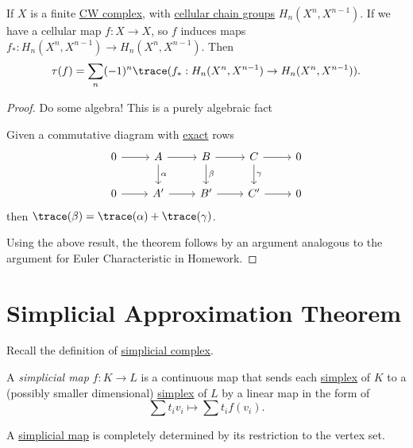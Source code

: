 \begin{theorem}\label{thm-}
	If \(X\) is a finite \hyperref[def:CW-Complex]{CW complex}, with \hyperref[def:cellular-chain-group]{cellular chain groups} \(H_n(X^n, X^{n - 1})\).
	If we have a cellular map \(f \colon X \to X\), so \(f\) induces maps \(f_\ast \colon H_n(X^n, X^{n - 1}) \to H_n(X^n, X^{n - 1})\). Then
	\[
		\tau(f) = \sum_n (-1)^n \trace(f_\ast : H_n(X^n, X^{n - 1}) \to H_n(X^n, X^{n - 1})).
	\]
\end{theorem}
\begin{proof}
	Do some algebra! This is a purely algebraic fact
	\begin{exercise}
		Given a commutative diagram with \hyperref[def:exact]{exact} rows
		\[
			\begin{tikzcd}
				0 & A & B & C & 0 \\
				0 & {A^\prime} & {B^\prime} & {C^\prime} & 0
				\arrow["\gamma", from=1-4, to=2-4]
				\arrow["\beta", from=1-3, to=2-3]
				\arrow["\alpha", from=1-2, to=2-2]
				\arrow[from=2-1, to=2-2]
				\arrow[from=2-2, to=2-3]
				\arrow[from=2-4, to=2-5]
				\arrow[from=2-3, to=2-4]
				\arrow[from=1-4, to=1-5]
				\arrow[from=1-3, to=1-4]
				\arrow[from=1-2, to=1-3]
				\arrow[from=1-1, to=1-2]
			\end{tikzcd}
		\]
		then \(\trace(\beta) = \trace(\alpha) + \trace(\gamma)\).
	\end{exercise}

	Using the above result, the theorem follows by an argument analogous to the argument for Euler Characteristic in Homework.
\end{proof}

\section{Simplicial Approximation Theorem}
\begin{prev}
	Recall the definition of \hyperref[def:simplicial-complex]{simplicial complex}.
\end{prev}

\begin{definition}\label{def:simplicial-map}
	A \emph{simplicial map} \(f \colon K \to L\) is a continuous map that sends each \hyperref[def:standard-simplex]{simplex} of \(K\) to a (possibly smaller dimensional)
	\hyperref[def:standard-simplex]{simplex} of \(L\) by a linear map in the form of
	\[
		\sum t_iv_i \mapsto \sum t_if(v_i).
	\]
\end{definition}
\begin{remark}
	A \hyperref[def:simplicial-map]{simplicial map} is completely determined by its restriction to the vertex set.
\end{remark}
